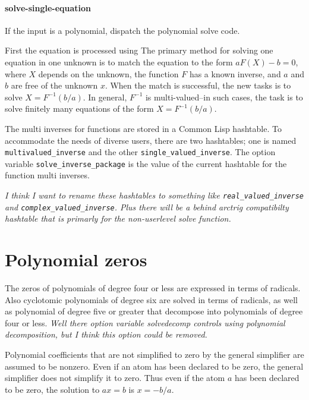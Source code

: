 \documentclass[]{scrartcl}
\newcommand{\multivaluedinverse}{\texttt{multivalued\_inverse}}
\newcommand{\singlevaluedinverse}{\texttt{single\_valued\_inverse}}
\newcommand{\solveinversepackage}{\texttt{solve\_inverse\_package}}
\begin{document}
\paragraph{solve-single-equation} If the input is a polynomial, dispatch the polynomial solve code.

First the equation is processed using
The primary method for solving one equation in one unknown is to match the equation to the form \(a F(X) - b = 0\), where \(X\) depends on the unknown, the function \(F\) has a known inverse, and \(a\) and \(b\) are free of the unknown \(x\). When the match is successful, the new tasks is to solve \(X = F^{-1}(b/a) \). In general, \(F^{-1}\) is multi-valued--in such cases, the task is to solve finitely many equations of the form  \(X = F^{-1}(b/a) \).

The multi inverses for functions are stored in a Common Lisp hashtable. To accommodate the needs of diverse users,
there are two hashtables; one is named \multivaluedinverse\/ and the other \singlevaluedinverse.  The option
variable \solveinversepackage\/ is the value of the current hashtable for the function multi inverses.

\emph{I think I want to rename these hashtables to something like \texttt{real\_valued\_inverse}
and \texttt{complex\_valued\_inverse}. Plus there will be a behind arctrig compatibilty hashtable that is primarly for the non-userlevel solve function.}

\section{Polynomial zeros}

The zeros of polynomials of degree four or less are expressed in terms of radicals. Also  cyclotomic polynomials of degree six are solved in terms of radicals, as well as polynomial of degree five or greater that decompose into polynomials of degree four or less. \emph{Well there option variable solvedecomp controls using polynomial decomposition, but I think this option could be removed.}

\begin{alphalist}[]

\item  Polynomial coefficients that are not simplified to zero by the  general simplifier are assumed to be nonzero. Even if an atom has been declared to be zero, the general simplifier does not simplify  it to zero. Thus even if the atom \(a\) has been declared to be zero, the solution to \(a x = b\) is \(x = -b/a \).



\end{alphalist}
\end{document}
